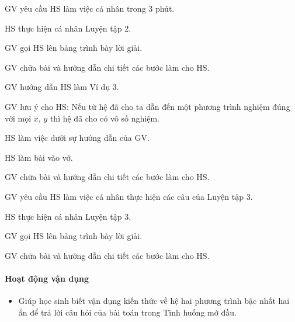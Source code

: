 \begin{tcth}[luyentap=2]
    \buocmot
    \item GV yêu cầu HS làm việc cá nhân trong 3 phút.
    \buochai
    \item HS thực hiện cá nhân Luyện tập 2. 
    \buocba
    \item GV gọi HS lên bảng trình bày lời giải.
    \buocbon
    \item GV chữa bài và hướng dẫn chi tiết các bước làm cho HS.
\end{tcth}

\begin{tcth}[vidu=3]
    \buocmot
    \item GV hướng dẫn HS làm Ví dụ 3.
    \item GV lưu ý cho HS: Nếu từ hệ đã cho ta dẫn đến một phương trình nghiệm đúng với mọi $x$, $y$ thì hệ đã cho có vô số nghiệm. 
    \buochai
    \item HS làm việc dưới sự hướng dẫn của GV. 
    \buocba
    \item HS làm bài vào vở.
    \buocbon
    \item GV chữa bài và hướng dẫn chi tiết các bước làm cho HS.
\end{tcth}

\begin{tcth}[luyentap=3]
    \buocmot
    \item GV yêu cầu HS làm việc cá nhân thực hiện các câu của Luyện tập 3.  
    \buochai
    \item HS thực hiện cá nhân Luyện tập 3. 
    \buocba
    \item GV gọi HS lên bảng trình bày lời giải.
    \buocbon
    \item GV chữa bài và hướng dẫn chi tiết các bước làm cho HS.
\end{tcth}

\paragraph{Hoạt động vận dụng}

\muctieu

\begin{itemize}
    \item Giúp học sinh biết vận dụng kiến thức về hệ hai phương trình bậc nhất hai ẩn để trả lời câu hỏi của bài toán trong Tình huống mở đầu.
\end{itemize}

\noidungsanpham

